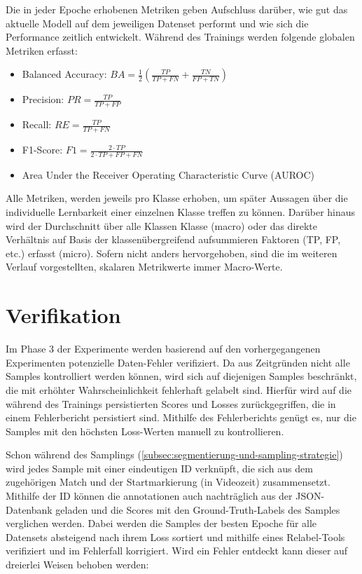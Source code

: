 Die in jeder Epoche erhobenen Metriken geben Aufschluss darüber, wie gut das aktuelle Modell auf dem jeweiligen Datenset performt und wie sich die Performance zeitlich entwickelt.
Während des Trainings werden folgende globalen Metriken erfasst:

\begin{itemize}
    \item Balanced Accuracy: $BA = \frac{1}{2} ( \frac{TP}{TP + FN} + \frac{TN}{FP + TN} )$
    \item Precision: $PR = \frac{TP}{TP+FP}$
    \item Recall: $RE = \frac{TP}{TP+FN}$
    \item F1-Score: $F1 = \frac{2 \cdot TP}{2 \cdot TP + FP + FN}$
    \item Area Under the Receiver Operating Characteristic Curve (AUROC)~\cite{Hand01}
\end{itemize}

Alle Metriken, werden jeweils pro Klasse erhoben, um später Aussagen über die individuelle Lernbarkeit einer einzelnen Klasse treffen zu können.
Darüber hinaus wird der Durchschnitt über alle Klassen Klasse (macro) oder das direkte Verhältnis auf Basis der klassenübergreifend aufsummieren Faktoren (TP, FP, etc.) erfasst (micro).
Sofern nicht anders hervorgehoben, sind die im weiteren Verlauf vorgestellten, skalaren Metrikwerte immer Macro-Werte.

\section{Verifikation}
\label{sec:nachgang}

Im Phase 3 der Experimente werden basierend auf den vorhergegangenen Experimenten potenzielle Daten-Fehler verifiziert.
Da aus Zeitgründen nicht alle Samples kontrolliert werden können, wird sich auf diejenigen Samples beschränkt, die mit erhöhter Wahrscheinlichkeit fehlerhaft gelabelt sind.
Hierfür wird auf die während des Trainings persistierten Scores und Losses zurückgegriffen, die in einem Fehlerbericht persistiert sind.
Mithilfe des Fehlerberichts genügt es, nur die Samples mit den höchsten Loss-Werten manuell zu kontrollieren.

Schon während des Samplings (\autoref{subsec:segmentierung-und-sampling-strategie}) wird jedes Sample mit einer eindeutigen ID verknüpft, die sich aus dem zugehörigen Match und der Startmarkierung (in Videozeit) zusammensetzt.
Mithilfe der ID können die \gls{annotationen} auch nachträglich aus der JSON-Datenbank geladen und die Scores mit den Ground-Truth-Labels des Samples verglichen werden.
Dabei werden die Samples der besten Epoche für alle Datensets absteigend nach ihrem Loss sortiert und mithilfe eines Relabel-Tools verifiziert und im Fehlerfall \ggf korrigiert.
Wird ein Fehler entdeckt kann dieser auf dreierlei Weisen behoben werden:

